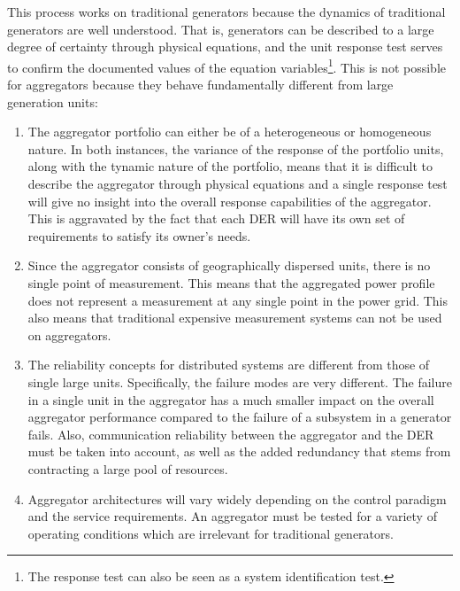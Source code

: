 This process works on traditional generators because the dynamics of traditional generators are well understood. That is, generators can be described to a large degree of certainty through physical equations, and the unit response test serves to confirm the documented values of the equation variables\footnote{The response test can also be seen as a system identification test.}. This is not possible for aggregators because they behave fundamentally different from large generation units:
\begin{enumerate}
	\item The aggregator portfolio can either be of a heterogeneous or homogeneous nature. In both instances, the variance of the response of the portfolio units, along with the tynamic nature of the portfolio, means that it is difficult to describe the aggregator through physical equations and a single response test will give no insight into the overall response capabilities of the aggregator. This is aggravated by the fact that each DER will have its own set of requirements to satisfy its owner's needs.
	\item Since the aggregator consists of geographically dispersed units, there is no single point of measurement. This means that the aggregated power profile does not represent a measurement at any single point in the power grid. This also means that traditional expensive measurement systems can not be used on aggregators.
	\item The reliability concepts for distributed systems are different from those of single large units. Specifically, the failure modes are very different. The failure in a single unit in the aggregator has a much smaller impact on the overall aggregator performance compared to the failure of a subsystem in a generator fails. Also, communication reliability between the aggregator and the DER must be taken into account, as well as the added redundancy that stems from contracting a large pool of resources.
	\item Aggregator architectures will vary widely depending on the control paradigm and the service requirements. An aggregator must be tested for a variety of operating conditions which are irrelevant for traditional generators.

\end{enumerate}
